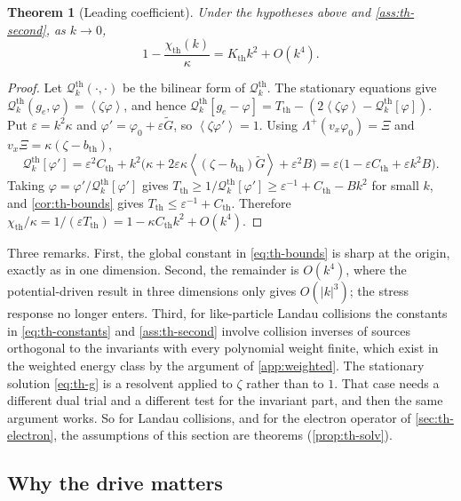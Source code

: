 \documentclass[11pt]{article}
\newcommand{\av}[1]{\left\langle #1\right\rangle}
\newcommand{\kap}{\kappa}
\newcommand{\thr}{\mathrm{th}}
\newcommand{\Qth}{\mathcal Q^{\thr}}
\newtheorem{theorem}{Theorem}[section]
\theoremstyle{definition}
\theoremstyle{remark}
\numberwithin{equation}{section}
\begin{document}
\begin{theorem}[Leading coefficient]\label{thm:th-leading}
Under the hypotheses above and \cref{ass:th-second}, as $k\to0$,
\begin{equation}
 1-\frac{\chi_\thr(k)}{\kap}=K_\thr k^2+O(k^4).
 \label{eq:th-leading}
\end{equation}
\end{theorem}

\begin{proof}
Let $\Qth_k(\cdot,\cdot)$ be the bilinear form of $\Qth_k$. The stationary
equations give $\Qth_k(g_e,\varphi)=\av{\zeta\varphi}$, and hence
$\Qth_k[g_e-\varphi]=T_\thr-(2\av{\zeta\varphi}-\Qth_k[\varphi])$. Put
$\varepsilon=k^2\kap$ and $\varphi'=\varphi_0+\varepsilon\widetilde G$, so
$\av{\zeta\varphi'}=1$. Using $\Lambda^+(v_x\varphi_0)=\Xi$ and
$v_x\Xi=\kap(\zeta-b_\thr)$,
\[
 \Qth_k[\varphi']=\varepsilon^2C_\thr+k^2\bigl(\kap
   +2\varepsilon\kap\av{(\zeta-b_\thr)\widetilde G}+\varepsilon^2B\bigr)
   =\varepsilon\bigl(1-\varepsilon C_\thr+\varepsilon k^2B\bigr).
\]
Taking $\varphi=\varphi'/\Qth_k[\varphi']$ gives
$T_\thr\geq1/\Qth_k[\varphi']\geq\varepsilon^{-1}+C_\thr-Bk^2$ for small $k$, and
\cref{cor:th-bounds} gives $T_\thr\leq\varepsilon^{-1}+C_\thr$. Therefore
$\chi_\thr/\kap=1/(\varepsilon T_\thr)=1-\kap C_\thr k^2+O(k^4)$.
\end{proof}

Three remarks. First, the global constant in
\eqref{eq:th-bounds} is sharp at the origin, exactly as in one dimension.
Second, the remainder is $O(k^4)$, where the potential-driven result in
three dimensions only gives $O(|k|^3)$; the stress response no longer
enters. Third, for like-particle Landau collisions the constants in
\eqref{eq:th-constants} and \cref{ass:th-second} involve collision inverses of
sources orthogonal to the invariants with every polynomial weight finite,
which exist in the weighted energy class by the argument of
\cref{app:weighted}. The stationary solution \eqref{eq:th-g} is a
resolvent applied to $\zeta$ rather than to $1$. That case needs a
different dual trial and a different test for the invariant part, and
then the same argument works. So for Landau collisions, and for the
electron operator of \cref{sec:th-electron}, the assumptions of this
section are theorems (\cref{prop:th-solv}).

\subsection{Why the drive matters}\label{sec:th-matrix}
\end{document}

